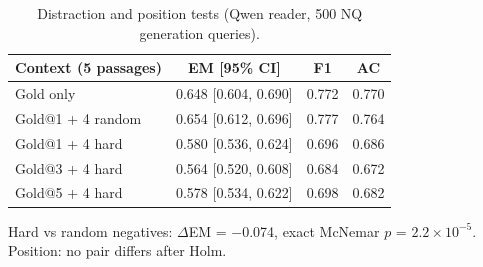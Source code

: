 \begin{table}[t]
\centering
\small
\caption{Distraction and position tests (Qwen reader, 500 NQ generation queries).}
\label{tab:mechanism}
\begin{tabular}{lccc}
\toprule
Context (5 passages) & EM [95\% CI] & F1 & AC \\
\midrule
Gold only & 0.648 [0.604, 0.690] & 0.772 & 0.770 \\
Gold@1 + 4 random & 0.654 [0.612, 0.696] & 0.777 & 0.764 \\
Gold@1 + 4 hard & 0.580 [0.536, 0.624] & 0.696 & 0.686 \\
Gold@3 + 4 hard & 0.564 [0.520, 0.608] & 0.684 & 0.672 \\
Gold@5 + 4 hard & 0.578 [0.534, 0.622] & 0.698 & 0.682 \\
\bottomrule
\end{tabular}
\par\smallskip\parbox{\linewidth}{\footnotesize Hard vs random negatives: $\Delta$EM = $-$0.074, exact McNemar $p$ = $2.2\times10^{-{}5}$. Position: no pair differs after Holm.}
\end{table}
